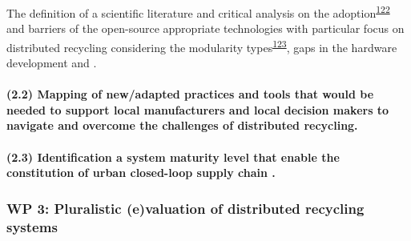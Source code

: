 \documentclass[
  12pt,
  a4paperpaper,
  onecolumn]{article}
\let\oldparagraph\paragraph
\renewcommand{\paragraph}[1]{\oldparagraph{#1}\mbox{}}
\let\paragraph\oldparagraph
\begin{document}
The definition of a scientific literature and critical analysis on the
adoption\textsuperscript{\protect\hyperlink{ref-reinauer2021}{122}} and
barriers of the open-source appropriate technologies with particular
focus on distributed recycling considering the modularity
types\textsuperscript{\protect\hyperlink{ref-gavras2021}{123}}, gaps in
the hardware development and .

\hypertarget{mapping-of-newadapted-practices-and-tools-that-would-be-needed-to-support-local-manufacturers-and-local-decision-makers-to-navigate-and-overcome-the-challenges-of-distributed-recycling.}{%
\paragraph{(2.2) Mapping of new/adapted practices and tools that would
be needed to support local manufacturers and local decision makers to
navigate and overcome the challenges of distributed
recycling.}\label{mapping-of-newadapted-practices-and-tools-that-would-be-needed-to-support-local-manufacturers-and-local-decision-makers-to-navigate-and-overcome-the-challenges-of-distributed-recycling.}}

\hypertarget{identification-a-system-maturity-level-that-enable-the-constitution-of-urban-closed-loop-supply-chain-.}{%
\paragraph{(2.3) Identification a system maturity level that enable the
constitution of urban closed-loop supply chain
.}\label{identification-a-system-maturity-level-that-enable-the-constitution-of-urban-closed-loop-supply-chain-.}}

\hypertarget{wp-3-pluralistic-evaluation-of-distributed-recycling-systems}{%
\subsubsection{WP 3: Pluralistic (e)valuation of distributed recycling
systems}\label{wp-3-pluralistic-evaluation-of-distributed-recycling-systems}}
\end{document}
